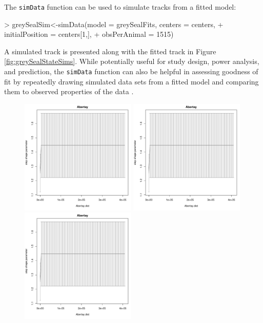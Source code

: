 \documentclass[12pt]{article}
\begin{document}
The \verb|simData| function can be used to simulate tracks from a fitted model:
\begin{Schunk}
\begin{Sinput}
> greySealSim<-simData(model = greySealFits, centers = centers,
+                      initialPosition = centers[1,],
+                      obsPerAnimal = 1515)
\end{Sinput}
\end{Schunk}
A simulated track is presented along with the fitted track in Figure \ref{fig:greySealStateSims}. While potentially useful for study design, power analysis, and prediction, the \verb|simData| function can also be helpful in assessing goodness of fit by repeatedly drawing simulated data sets from a fitted model and comparing them to observed properties of the data \citep[e.g.][]{MoralesEtAl2004}.
\begin{figure}[htbp]
  \includegraphics[width=0.49\textwidth,page=2]{plot_greySealResults1}
  \includegraphics[width=0.49\textwidth,page=9]{plot_greySealResults1}\\
  \includegraphics[width=0.49\textwidth,page=6]{plot_greySealResults1}

\end{figure}
\end{document}
